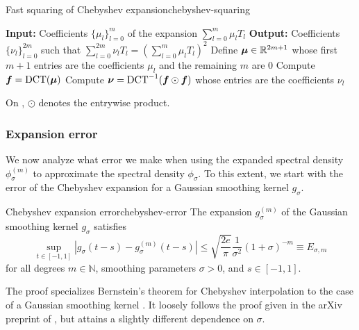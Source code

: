 \documentclass[12pt]{article}
\begin{document}
\begin{algo}{Fast squaring of Chebyshev expansion}{chebyshev-squaring}
    \begin{algorithmic}[1]
        \Statex \textbf{Input:} Coefficients $\{ \mu_l \}_{l=0}^{m}$ of the expansion $\sum_{l=0}^{m} \mu_l T_l$
        \Statex \textbf{Output:} Coefficients $\{ \nu_l \}_{l=0}^{2m}$ such that $\sum_{l=0}^{2m} \nu_l T_l = (\sum_{l=0}^{m} \mu_l T_l)^2$
        \State Define $\boldsymbol{\mu} \in \mathbb{R}^{2m + 1}$ whose first $m + 1$ entries are the coefficients $\mu_l$ and the remaining $m$ are $0$
    \State Compute $\boldsymbol{f} = \operatorname{DCT}(\boldsymbol{\mu})$
    \State Compute $\boldsymbol{\nu} = \operatorname{DCT}^{-1}(\boldsymbol{f} \odot \boldsymbol{f})$ whose entries are the coefficients $\nu_l$
    \label{lin:inverse-DCT}
    \end{algorithmic}
\end{algo}
On , $\odot$ denotes the entrywise product.

\subsubsection{Expansion error}
\label{subsubsec:expansion-error}

We now analyze what error we make when using the expanded spectral density $\phi_{\sigma}^{(m)}$ to approximate the spectral density $\phi_{\sigma}$. To this extent, we start with the error of the Chebyshev expansion for a Gaussian smoothing kernel $g_{\sigma}$.

\begin{lemma}{Chebyshev expansion error}{chebyshev-error}
    The expansion $g_{\sigma}^{(m)}$ of the Gaussian smoothing kernel $g_{{\sigma}}$  satisfies
    \begin{equation}
        \sup_{t \in [-1, 1]} \left| g_{\sigma}(t - s) - g_{\sigma}^{(m)}(t - s) \right| \leq \sqrt{\frac{2e}{\pi}} \frac{1}{\sigma^2} (1 + \sigma)^{-m} \equiv E_{\sigma, m}
        \label{equ:chebyshev-interpolation-sup-error-kernel}
    \end{equation}
    for all degrees $m \in \mathbb{N}$, smoothing parameters $\sigma > 0$, and $s \in [-1, 1]$.
\end{lemma}

The proof specializes Bernstein's theorem for Chebyshev interpolation to the case of a Gaussian smoothing kernel . It loosely follows the proof given in the arXiv preprint of \cite[theorem 2]{lin-2017-randomized-estimation}, but attains a slightly different dependence on $\sigma$.
\end{document}
